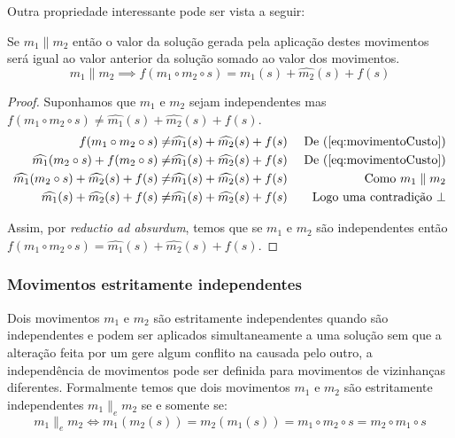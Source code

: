 Outra propriedade interessante pode ser vista a seguir:
\begin{theorem}\label{teo:independenciaMovimentos2a2}
Se $m_1 \parallel m_2$ então o valor da solução gerada pela aplicação destes movimentos será igual ao valor anterior da solução somado ao valor dos movimentos.
\begin{equation}
\label{eq:movimentoCustoSomaDois}
m_1 \parallel m_2 \implies f(m_1 \circ m_2 \circ s) = \widehat{m_1}(s) + \widehat{m_2}(s) + f(s)
\end{equation}
\begin{proof}
    Suponhamos que $m_1$ e $m_2$ sejam independentes mas $f(m_1 \circ m_2 \circ s) \neq \widehat{m_1}(s) + \widehat{m_2}(s) + f(s)$.
    \begin{align*}
        f(m_1 \circ m_2 \circ s) \neq & \widehat{m_1}(s) + \widehat{m_2}(s) + f(s) & \textrm{ De } (\ref{eq:movimentoCusto}) \\
        \widehat{m_1}(m_2 \circ s) + f(m_2 \circ s) \neq & \widehat{m_1}(s) + \widehat{m_2}(s) + f(s) & \textrm{ De } (\ref{eq:movimentoCusto}) \\
        \widehat{m_1}(m_2 \circ s) + \widehat{m_2}(s) + f(s) \neq & \widehat{m_1}(s) + \widehat{m_2}(s) + f(s) & \textrm{ Como } m_1 \parallel m_2 \\
        \widehat{m_1}(s) + \widehat{m_2}(s) + f(s) \neq & \widehat{m_1}(s) + \widehat{m_2}(s) + f(s) & \textrm{ Logo uma contradição } \bot
    \end{align*}
    
    Assim, por \textit{reductio ad absurdum}, temos que se $m_1$ e $m_2$ são independentes então $f(m_1 \circ m_2 \circ s) = \widehat{m_1}(s) + \widehat{m_2}(s) + f(s)$.
\end{proof}
\end{theorem}

\subsubsection{Movimentos estritamente independentes} \label{subsubsec:movimentosEstritamenteIndependentes}

Dois movimentos $m_1$ e $m_2$ são estritamente independentes quando são independentes e podem ser aplicados simultaneamente a uma solução sem que a alteração feita por um gere algum conflito na causada pelo outro, a independência de movimentos pode ser definida para movimentos de vizinhanças diferentes.
Formalmente temos que dois movimentos $m_1$ e $m_2$ são estritamente independentes $m_1 \parallel_e m_2$ se e somente se:
\begin{equation}  \label{eq:movimentosIndependentes}
m_1 \parallel_e m_2 \iff m_1(m_2(s)) = m_2(m_1(s)) = m_1 \circ m_2 \circ s = m_2 \circ m_1 \circ s
\end{equation}

